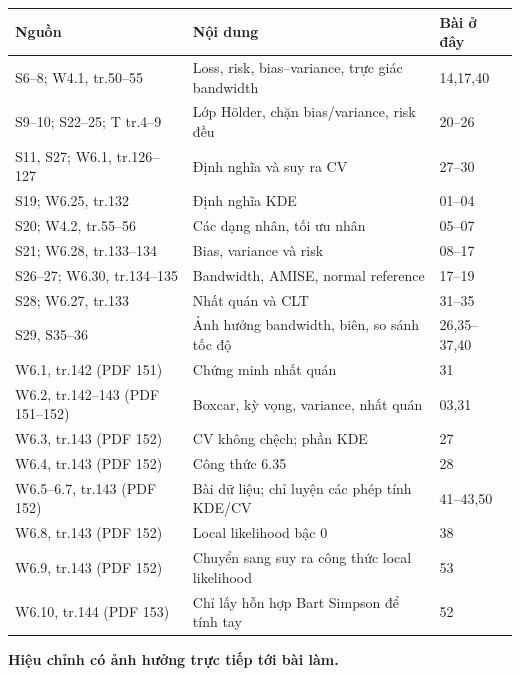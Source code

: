 \documentclass[11pt,a4paper]{article}
\theoremstyle{definition}
\begin{document}
\begin{longtable}{>{\raggedright\arraybackslash}p{4.5cm}>{\raggedright\arraybackslash}p{6.3cm}p{2.2cm}}
\toprule Nguồn & Nội dung & Bài ở đây\\\midrule\endhead
S6--8; W4.1, tr.50--55 & Loss, risk, bias--variance, trực giác bandwidth & 14,17,40\\
S9--10; S22--25; T tr.4--9 & Lớp Hölder, chặn bias/variance, risk đều & 20--26\\
S11, S27; W6.1, tr.126--127 & Định nghĩa và suy ra CV & 27--30\\
S19; W6.25, tr.132 & Định nghĩa KDE & 01--04\\
S20; W4.2, tr.55--56 & Các dạng nhân, tối ưu nhân & 05--07\\
S21; W6.28, tr.133--134 & Bias, variance và risk & 08--17\\
S26--27; W6.30, tr.134--135 & Bandwidth, AMISE, normal reference & 17--19\\
S28; W6.27, tr.133 & Nhất quán và CLT & 31--35\\
S29, S35--36 & Ảnh hưởng bandwidth, biên, so sánh tốc độ & 26,35--37,40\\
W6.1, tr.142 (PDF 151) & Chứng minh nhất quán & 31\\
W6.2, tr.142--143 (PDF 151--152) & Boxcar, kỳ vọng, variance, nhất quán & 03,31\\
W6.3, tr.143 (PDF 152) & CV không chệch; phần KDE & 27\\
W6.4, tr.143 (PDF 152) & Công thức 6.35 & 28\\
W6.5--6.7, tr.143 (PDF 152) & Bài dữ liệu; chỉ luyện các phép tính KDE/CV & 41--43,50\\
W6.8, tr.143 (PDF 152) & Local likelihood bậc 0 & 38\\
W6.9, tr.143 (PDF 152) & Chuyển sang suy ra công thức local likelihood & 53\\
W6.10, tr.144 (PDF 153) & Chỉ lấy hỗn hợp Bart Simpson để tính tay & 52\\\bottomrule
\end{longtable}
\textbf{Hiệu chỉnh có ảnh hưởng trực tiếp tới bài làm.}
\end{document}
